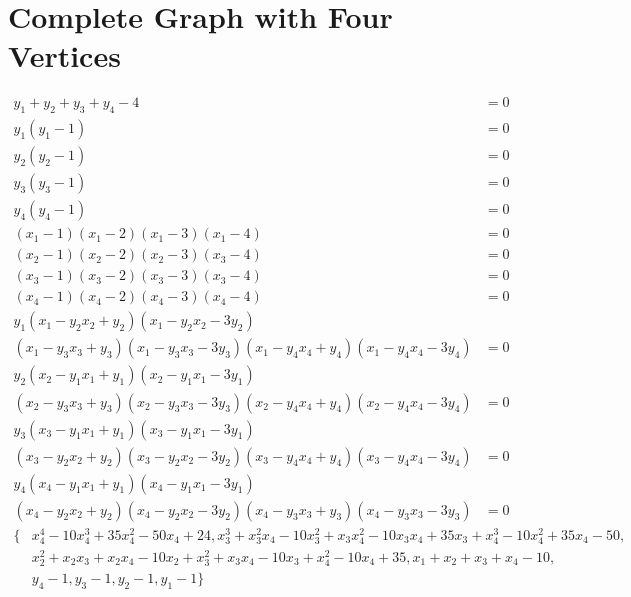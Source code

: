 \documentclass[letterpaper]{article}
\newcommand{\aln}[1]{\begin{align*} #1 \end{align*}} %
\begin{document}
\section{Complete Graph with Four Vertices}
\begin{center}
\end{center}
\aln{
	y_1 + y_2 + y_3 + y_4 - 4 &= 0\\
	y_1(y_1 - 1) &= 0\\
	y_2(y_2 - 1) &= 0\\
	y_3(y_3 - 1) &= 0\\
	y_4(y_4 - 1) &= 0\\
	(x_1 - 1)(x_1 - 2)(x_1 - 3)(x_1 - 4) &= 0\\
	(x_2 - 1)(x_2 - 2)(x_2 - 3)(x_3 - 4) &= 0\\
	(x_3 - 1)(x_3 - 2)(x_3 - 3)(x_3 - 4) &= 0\\
	(x_4 - 1)(x_4 - 2)(x_4 - 3)(x_4 - 4) &= 0\\
	y_1 (x_1 - y_2 x_2 + y_2)(x_1 - y_2 x_2 - 3y_2)&\\(x_1 - y_3 x_3 + y_3)(x_1 - y_3 x_3 - 3y_3)(x_1 - y_4 x_4 + y_4)(x_1 - y_4 x_4 - 3y_4) &= 0\\
	y_2 (x_2 - y_1 x_1 + y_1)(x_2 - y_1 x_1 - 3y_1)&\\(x_2 - y_3 x_3 + y_3)(x_2 - y_3 x_3 - 3y_3)(x_2 - y_4 x_4 + y_4)(x_2 - y_4 x_4 - 3y_4) &= 0\\
	y_3 (x_3 - y_1 x_1 + y_1)(x_3 - y_1 x_1 - 3y_1)&\\(x_3 - y_2 x_2 + y_2)(x_3 - y_2 x_2 - 3y_2)(x_3 - y_4 x_4 + y_4)(x_3 - y_4 x_4 - 3y_4) &= 0\\
	y_4 (x_4 - y_1 x_1 + y_1)(x_4 - y_1 x_1 - 3y_1)&\\(x_4 - y_2 x_2 + y_2)(x_4 - y_2 x_2 - 3y_2)(x_4 - y_3 x_3 + y_3)(x_4 - y_3 x_3 - 3y_3) &= 0
}
\aln{
	\{&x_4^4-10x_4^3+35x_4^2-50x_4+24, x_3^3+x_3^2x_4-10x_3^2+x_3x_4^2-10x_3x_4+35x_3+x_4^3-10x_4^2+35x_4-50,\\& x_2^2+x_2x_3+x_2x_4-10x_2+x_3^2+x_3x_4-10x_3+x_4^2-10x_4+35, x_1+x_2+x_3+x_4-10,\\& y_4-1, y_3-1, y_2-1, y_1-1\}
}

\newpage
\end{document}
